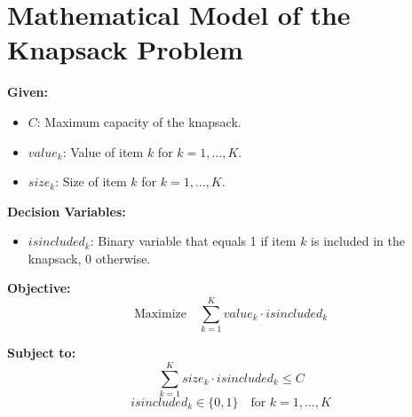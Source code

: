 \documentclass{article}
\begin{document}
\section*{Mathematical Model of the Knapsack Problem}

\textbf{Given:}
\begin{itemize}
    \item $C$: Maximum capacity of the knapsack.
    \item $value_k$: Value of item $k$ for $k = 1, \ldots, K$.
    \item $size_k$: Size of item $k$ for $k = 1, \ldots, K$.
\end{itemize}

\textbf{Decision Variables:}
\begin{itemize}
    \item $isincluded_k$: Binary variable that equals 1 if item $k$ is included in the knapsack, 0 otherwise.
\end{itemize}

\textbf{Objective:}
\[
\text{Maximize} \quad \sum_{k=1}^{K} value_k \cdot isincluded_k
\]

\textbf{Subject to:}
\[
\sum_{k=1}^{K} size_k \cdot isincluded_k \leq C
\]
\[
isincluded_k \in \{0, 1\} \quad \text{for } k = 1, \ldots, K
\]
\end{document}
